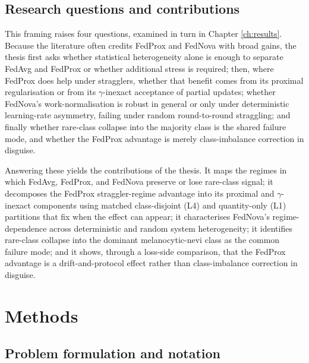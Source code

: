 \documentclass[11pt,a4paper]{report}
\begin{document}
\section{Research questions and contributions}
\label{sec:intro-questions}

This framing raises four questions, examined in turn in
Chapter \ref{ch:results}. Because the literature often credits FedProx and
FedNova with broad gains, the thesis first asks whether statistical heterogeneity
alone is enough to separate FedAvg and FedProx or whether additional stress is
required; then, where FedProx does help under stragglers, whether that benefit
comes from its proximal regularisation or from its $\gamma$-inexact acceptance of
partial updates; whether FedNova's work-normalisation is robust in general or
only under deterministic learning-rate asymmetry, failing under random
round-to-round straggling; and finally whether rare-class collapse into the
majority class is the shared failure mode, and whether the FedProx advantage is
merely class-imbalance correction in disguise.

Answering these yields the contributions of the thesis. It maps the regimes in
which FedAvg, FedProx, and FedNova preserve or lose rare-class signal; it
decomposes the FedProx straggler-regime advantage into its proximal and
$\gamma$-inexact components using matched class-disjoint (L4) and quantity-only
(L1) partitions that fix when the effect can appear; it characterises FedNova's
regime-dependence across deterministic and random system heterogeneity; it
identifies rare-class collapse into the dominant melanocytic-nevi class as the
common failure mode; and it shows, through a loss-side comparison, that the
FedProx advantage is a drift-and-protocol effect rather than class-imbalance
correction in disguise.


\chapter{Methods}
\label{ch:methods}


\section{Problem formulation and notation}
\label{sec:method-problem}
\end{document}
